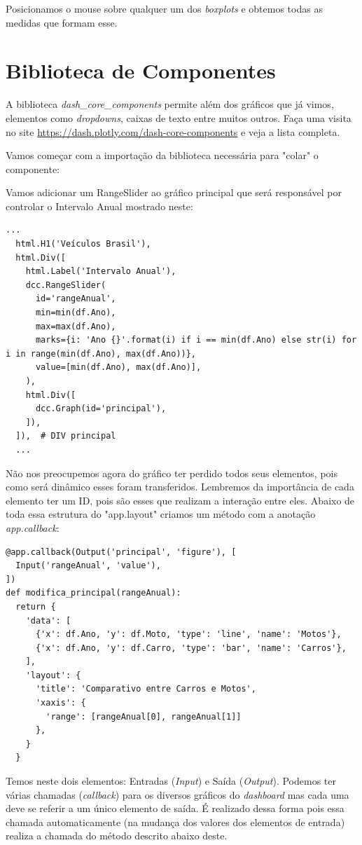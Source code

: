 \documentclass[a4paper,11pt]{article}
\begin{document}
Posicionamos o mouse sobre qualquer um dos \textit{boxplots} e obtemos todas as medidas que formam esse.

\section{Biblioteca de Componentes}
A biblioteca \textit{dash\_core\_components} permite além dos gráficos que já vimos, elementos como \textit{dropdowns}, caixas de texto entre muitos outros. Faça uma visita no site \url{https://dash.plotly.com/dash-core-components} e veja a lista completa.

Vamos começar com a importação da biblioteca necessária para "colar" o componente: \\

Vamos adicionar um RangeSlider ao gráfico principal que será responsável por controlar o Intervalo Anual mostrado neste:
\begin{lstlisting}[]
  ...
  html.H1('Veículos Brasil'),
  html.Div([
    html.Label('Intervalo Anual'),
    dcc.RangeSlider(
      id='rangeAnual',
      min=min(df.Ano),
      max=max(df.Ano),
      marks={i: 'Ano {}'.format(i) if i == min(df.Ano) else str(i) for i in range(min(df.Ano), max(df.Ano))},
      value=[min(df.Ano), max(df.Ano)],
    ),
    html.Div([
      dcc.Graph(id='principal'),
    ]),
  ]),  # DIV principal
  ...
\end{lstlisting}

Não nos preocupemos agora do gráfico ter perdido todos seus elementos, pois como será dinâmico esses foram transferidos. Lembremos da importância de cada elemento ter um ID, pois são esses que realizam a interação entre eles. Abaixo de toda essa estrutura do "app.layout" criamos um método com a anotação \textit{app.callback}:
\begin{lstlisting}[]
@app.callback(Output('principal', 'figure'), [
  Input('rangeAnual', 'value'),
])
def modifica_principal(rangeAnual):
  return {
    'data': [
      {'x': df.Ano, 'y': df.Moto, 'type': 'line', 'name': 'Motos'},
      {'x': df.Ano, 'y': df.Carro, 'type': 'bar', 'name': 'Carros'},
    ],
    'layout': {
      'title': 'Comparativo entre Carros e Motos',
      'xaxis': {
        'range': [rangeAnual[0], rangeAnual[1]]
      },
    }
  }
\end{lstlisting}

Temos neste dois elementos: Entradas (\textit{Input}) e Saída (\textit{Output}). Podemos ter várias chamadas (\textit{callback}) para os diversos gráficos do \textit{dashboard} mas cada uma deve se referir a um único elemento de saída. É realizado dessa forma pois essa chamada automaticamente (na mudança dos valores dos elementos de entrada) realiza a chamada do método descrito abaixo deste.
\end{document}

